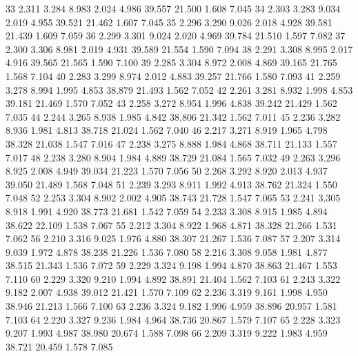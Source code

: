 \documentclass[a4paper,11pt]{scrartcl}
\begin{document}
\begin{Schunk}
\begin{Soutput}
33   2.311  3.284    8.983     2.024  4.986   39.557   21.500    1.608  7.045
34   2.303  3.283    9.034     2.019  4.955   39.521   21.462    1.607  7.045
35   2.296  3.290    9.026     2.018  4.928   39.581   21.439    1.609  7.059
36   2.299  3.301    9.024     2.020  4.969   39.784   21.510    1.597  7.082
37   2.300  3.306    8.981     2.019  4.931   39.589   21.554    1.590  7.094
38   2.291  3.308    8.995     2.017  4.916   39.565   21.565    1.590  7.100
39   2.285  3.304    8.972     2.008  4.869   39.165   21.765    1.568  7.104
40   2.283  3.299    8.974     2.012  4.883   39.257   21.766    1.580  7.093
41   2.259  3.278    8.994     1.995  4.853   38.879   21.493    1.562  7.052
42   2.261  3.281    8.932     1.998  4.853   39.181   21.469    1.570  7.052
43   2.258  3.272    8.954     1.996  4.838   39.242   21.429    1.562  7.035
44   2.244  3.265    8.938     1.985  4.842   38.806   21.342    1.562  7.011
45   2.236  3.282    8.936     1.981  4.813   38.718   21.024    1.562  7.040
46   2.217  3.271    8.919     1.965  4.798   38.328   21.038    1.547  7.016
47   2.238  3.275    8.888     1.984  4.868   38.711   21.133    1.557  7.017
48   2.238  3.280    8.904     1.984  4.889   38.729   21.084    1.565  7.032
49   2.263  3.296    8.925     2.008  4.949   39.034   21.223    1.570  7.056
50   2.268  3.292    8.920     2.013  4.937   39.050   21.489    1.568  7.048
51   2.239  3.293    8.911     1.992  4.913   38.762   21.324    1.550  7.048
52   2.253  3.304    8.902     2.002  4.905   38.743   21.728    1.547  7.065
53   2.241  3.305    8.918     1.991  4.920   38.773   21.681    1.542  7.059
54   2.233  3.308    8.915     1.985  4.894   38.622   22.109    1.538  7.067
55   2.212  3.304    8.922     1.968  4.871   38.328   21.266    1.531  7.062
56   2.210  3.316    9.025     1.976  4.880   38.307   21.267    1.536  7.087
57   2.207  3.314    9.039     1.972  4.878   38.238   21.226    1.536  7.080
58   2.216  3.308    9.058     1.981  4.877   38.515   21.343    1.536  7.072
59   2.229  3.324    9.198     1.994  4.870   38.863   21.467    1.553  7.110
60   2.229  3.320    9.210     1.994  4.892   38.891   21.404    1.562  7.103
61   2.243  3.322    9.182     2.007  4.938   39.012   21.421    1.570  7.109
62   2.236  3.319    9.161     1.998  4.950   38.946   21.213    1.566  7.100
63   2.236  3.324    9.182     1.996  4.959   38.896   20.957    1.581  7.103
64   2.220  3.327    9.236     1.984  4.964   38.736   20.867    1.579  7.107
65   2.228  3.323    9.207     1.993  4.987   38.980   20.674    1.588  7.098
66   2.209  3.319    9.222     1.983  4.959   38.721   20.459    1.578  7.085

\end{Soutput}
\end{Schunk}
\end{document}
